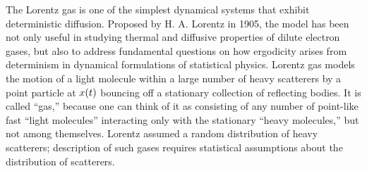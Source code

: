 


The Lorentz gas is one of the simplest dynamical syst\-ems that exhibit
deterministic diffusion.
Proposed by H. A. Lorentz in 1905, the model has been not only
useful in studying thermal and diffusive properties of dilute electron gases, but
also to address fundamental questions on how ergodicity arises from determinism
in dynamical formulations of statistical physics.
Lorentz gas models the motion of a light molecule within a large number of heavy
scatterers by a point particle at $x(t)$ bouncing off a stationary collection
of reflecting bodies.
It is called ``gas,'' because one can think of it as consisting of any number of
point-like fast ``light molecules'' interacting only with the stationary ``heavy
molecules,'' but not among themselves.
Lorentz assumed a random distribution of heavy scatterers; description of such
gases requires statistical assumptions about the distribution of scatterers.

